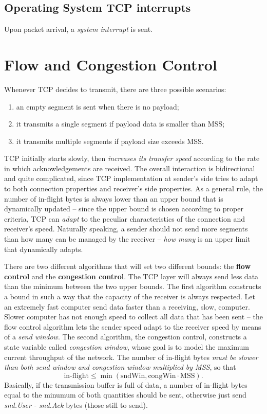 \documentclass[a4paper, 11pt]{report}
\begin{document}
\section{Operating System TCP interrupts}

Upon packet arrival, a \emph{system interrupt} is sent. 

\chapter{Flow and Congestion Control}

Whenever TCP decides to transmit, there are three possible scenarios: 
\begin{enumerate}
	\item an empty segment is sent when there is no payload;
	\item it transmits a single segment if payload data is smaller than MSS;
	\item it transmits multiple segments if payload size exceeds MSS.
\end{enumerate}

TCP initially starts slowly, then \emph{increases its transfer speed} according
to the rate in which acknowledgements are received. The overall interaction is
bidirectional and quite complicated, since TCP implementation at sender's side
tries to adapt to both connection properties and receiver's side properties.
As a general rule, the number of in-flight bytes is always lower than an upper
bound that is dynamically updated \--- since the upper bound is chosen
according to proper criteria, TCP can \emph{adapt} to the peculiar
characteristics of the connection and receiver's speed. Naturally speaking, a
sender should not send more segments than how many can be managed by the
receiver \--- \emph{how many} is an upper limit that dynamically adapts.

There are two different algorithms that will set two different bounds: the
\textbf{flow control} and the \textbf{congestion control}. The TCP layer will
always send less data than the minimum between the two upper bounds. The first
algorithm constructs a bound in such a way that the capacity of the receiver is
always respected. Let an extremely fast computer send data faster than a
receiving, slow, computer. Slower computer has not enough speed to collect all
data that has been sent \--- the flow control algorithm lets the sender speed
adapt to the receiver speed by means of a \emph{send window}. The second
algorithm, the congestion control, constructs a state variable called
\emph{congestion window}, whose goal is to model the maximum current throughput
of the network. The number of in-flight bytes \emph{must be slower than both
send window and congestion window multiplied by MSS}, so that
$$\mbox{in-flight} \leq \min(\mbox{sndWin}, \mbox{congWin} \cdot \mbox{MSS}).$$
Basically, if the transmission buffer is full of data, a number of in-flight
bytes equal to the minumum of both quantities should be sent, otherwise just
send \emph{snd.User - snd.Ack} bytes (those still to send).
\end{document}
